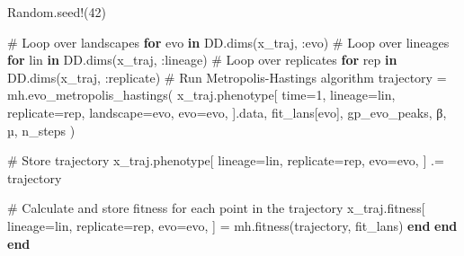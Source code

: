 \documentclass[
]{scrartcl}
\newenvironment{Shaded}{\begin{snugshade}}{\end{snugshade}}
\newcommand{\BuiltInTok}[1]{\textcolor[rgb]{0.00,0.23,0.31}{#1}}
\newcommand{\CommentTok}[1]{\textcolor[rgb]{0.37,0.37,0.37}{#1}}
\newcommand{\ControlFlowTok}[1]{\textcolor[rgb]{0.00,0.23,0.31}{\textbf{#1}}}
\newcommand{\FloatTok}[1]{\textcolor[rgb]{0.68,0.00,0.00}{#1}}
\newcommand{\FunctionTok}[1]{\textcolor[rgb]{0.28,0.35,0.67}{#1}}
\newcommand{\KeywordTok}[1]{\textcolor[rgb]{0.00,0.23,0.31}{\textbf{#1}}}
\newcommand{\NormalTok}[1]{\textcolor[rgb]{0.00,0.23,0.31}{#1}}
\newcommand{\OperatorTok}[1]{\textcolor[rgb]{0.37,0.37,0.37}{#1}}
\begin{document}
\begin{Shaded}
\begin{Highlighting}[]
\BuiltInTok{Random}\NormalTok{.}\FunctionTok{seed!}\NormalTok{(}\FloatTok{42}\NormalTok{)}

\CommentTok{\# Loop over landscapes}
\ControlFlowTok{for}\NormalTok{ evo }\KeywordTok{in}\NormalTok{ DD.}\FunctionTok{dims}\NormalTok{(x\_traj, }\OperatorTok{:}\NormalTok{evo)}
    \CommentTok{\# Loop over lineages}
    \ControlFlowTok{for}\NormalTok{ lin }\KeywordTok{in}\NormalTok{ DD.}\FunctionTok{dims}\NormalTok{(x\_traj, }\OperatorTok{:}\NormalTok{lineage)}
        \CommentTok{\# Loop over replicates}
        \ControlFlowTok{for}\NormalTok{ rep }\KeywordTok{in}\NormalTok{ DD.}\FunctionTok{dims}\NormalTok{(x\_traj, }\OperatorTok{:}\NormalTok{replicate)}
            \CommentTok{\# Run Metropolis{-}Hastings algorithm}
\NormalTok{            trajectory }\OperatorTok{=}\NormalTok{ mh.}\FunctionTok{evo\_metropolis\_hastings}\NormalTok{(}
\NormalTok{                x\_traj.phenotype[}
\NormalTok{                    time}\OperatorTok{=}\FloatTok{1}\NormalTok{,}
\NormalTok{                    lineage}\OperatorTok{=}\NormalTok{lin,}
\NormalTok{                    replicate}\OperatorTok{=}\NormalTok{rep,}
\NormalTok{                    landscape}\OperatorTok{=}\NormalTok{evo,}
\NormalTok{                    evo}\OperatorTok{=}\NormalTok{evo,}
\NormalTok{                ].data,}
\NormalTok{                fit\_lans[evo],}
\NormalTok{                gp\_evo\_peaks,}
\NormalTok{                β,}
\NormalTok{                µ,}
\NormalTok{                n\_steps}
\NormalTok{            )}

            \CommentTok{\# Store trajectory}
\NormalTok{            x\_traj.phenotype[}
\NormalTok{                lineage}\OperatorTok{=}\NormalTok{lin,}
\NormalTok{                replicate}\OperatorTok{=}\NormalTok{rep,}
\NormalTok{                evo}\OperatorTok{=}\NormalTok{evo,}
\NormalTok{            ] }\OperatorTok{.=}\NormalTok{ trajectory}

            \CommentTok{\# Calculate and store fitness for each point in the trajectory}
\NormalTok{            x\_traj.fitness[}
\NormalTok{                lineage}\OperatorTok{=}\NormalTok{lin,}
\NormalTok{                replicate}\OperatorTok{=}\NormalTok{rep,}
\NormalTok{                evo}\OperatorTok{=}\NormalTok{evo,}
\NormalTok{            ] }\OperatorTok{=}\NormalTok{ mh.}\FunctionTok{fitness}\NormalTok{(trajectory, fit\_lans)}
        \ControlFlowTok{end}
    \ControlFlowTok{end}
\ControlFlowTok{end}
\end{Highlighting}
\end{Shaded}
\end{document}
